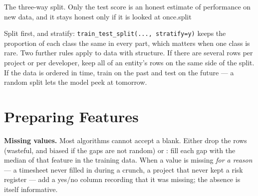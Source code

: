 %
{The three-way split. Only the test score is an honest estimate of performance on new
data, and it stays honest only if it is looked at once.}{split}

\begin{alertbox}
Split first, and stratify: \texttt{train\_test\_split(..., stratify=y)} keeps the
proportion of each class the same in every part, which matters when one class is
rare. Two further rules apply to data with structure. If there are several rows
per project or per developer, keep all of an entity's rows on the same side of
the split. If the data is ordered in time, train on the past and test on the
future --- a random split lets the model peek at tomorrow.
\end{alertbox}

\section{Preparing Features}

\textbf{Missing values.} Most algorithms cannot accept a blank. Either drop the
rows (wasteful, and biased if the gaps are not random) or : fill
each gap with the median of that feature in the training data. When a value is
missing \emph{for a reason} --- a timesheet never filled in during a crunch, a
project that never kept a risk register --- add a yes/no column recording that it
was missing; the absence is itself informative.

